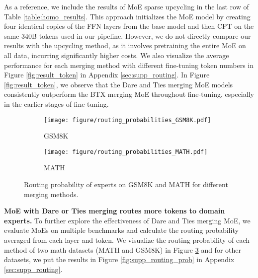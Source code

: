 As a reference, we include the results of MoE sparse upcycling \cite{komatsuzaki2022sparse} in the last row of Table \ref{table:homo_results}. This approach initializes the MoE model by creating four identical copies of the FFN layers from the base model and then CPT on the same 340B tokens used in our pipeline. However, we do not directly compare our results with the upcycling method, as it involves pretraining the entire MoE on all data, incurring significantly higher costs.
We also visualize the average performance for each merging method with different fine-tuning token numbers in Figure \ref{fig:result_token} in Appendix \ref{sec:supp_routing}.
In Figure \ref{fig:result_token}, we observe that the Dare and Ties merging MoE models consistently outperform the BTX merging MoE throughout fine-tuning, especially in the earlier stages of fine-tuning. 

\begin{figure}[!t]
    \centering
    \begin{subfigure}[b]{0.48\columnwidth}
        \centering
        \texttt{[image: figure/routing\_probabilities\_GSM8K.pdf]}
        \caption{GSM8K}
        \label{fig:gsm8k_route}
    \end{subfigure}
    \hfill
    \begin{subfigure}[b]{0.48\columnwidth}
        \centering
        \texttt{[image: figure/routing\_probabilities\_MATH.pdf]}
        \caption{MATH}
        \label{fig:math_route}
    \end{subfigure}
    \vspace{-0.5em}
    \caption{Routing probability of experts on GSM8K and MATH for different merging methods.}
    \label{fig:routing_prob}
\end{figure}


\noindent \textbf{MoE with Dare or Ties merging routes more tokens to domain experts.}\quad
To further explore the effectiveness of Dare and Ties merging MoE, we evaluate MoEs on multiple benchmarks and calculate the routing probability averaged from each layer and token. We visualize the routing probability of each method of two math datasets (MATH and GSM8K) in Figure \ref{fig:routing_prob} and for other datasets, we put the results in Figure \ref{fig:supp_routing_prob} in Appendix \ref{sec:supp_routing}.


